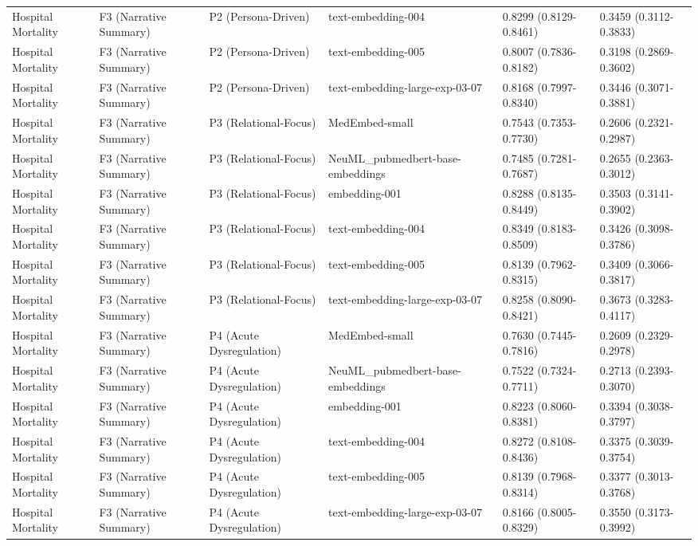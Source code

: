 \documentclass[border=0pt]{standalone}
\begin{document}
\begin{adjustbox}{width=\textwidth}
\begin{tabular}{llllll}
Hospital Mortality & F3 (Narrative Summary) & P2 (Persona-Driven) & text-embedding-004 & 0.8299 (0.8129-0.8461) & 0.3459 (0.3112-0.3833) \\
Hospital Mortality & F3 (Narrative Summary) & P2 (Persona-Driven) & text-embedding-005 & 0.8007 (0.7836-0.8182) & 0.3198 (0.2869-0.3602) \\
Hospital Mortality & F3 (Narrative Summary) & P2 (Persona-Driven) & text-embedding-large-exp-03-07 & 0.8168 (0.7997-0.8340) & 0.3446 (0.3071-0.3881) \\
Hospital Mortality & F3 (Narrative Summary) & P3 (Relational-Focus) & MedEmbed-small & 0.7543 (0.7353-0.7730) & 0.2606 (0.2321-0.2987) \\
Hospital Mortality & F3 (Narrative Summary) & P3 (Relational-Focus) & NeuML\_pubmedbert-base-embeddings & 0.7485 (0.7281-0.7687) & 0.2655 (0.2363-0.3012) \\
Hospital Mortality & F3 (Narrative Summary) & P3 (Relational-Focus) & embedding-001 & 0.8288 (0.8135-0.8449) & 0.3503 (0.3141-0.3902) \\
Hospital Mortality & F3 (Narrative Summary) & P3 (Relational-Focus) & text-embedding-004 & 0.8349 (0.8183-0.8509) & 0.3426 (0.3098-0.3786) \\
Hospital Mortality & F3 (Narrative Summary) & P3 (Relational-Focus) & text-embedding-005 & 0.8139 (0.7962-0.8315) & 0.3409 (0.3066-0.3817) \\
Hospital Mortality & F3 (Narrative Summary) & P3 (Relational-Focus) & text-embedding-large-exp-03-07 & 0.8258 (0.8090-0.8421) & 0.3673 (0.3283-0.4117) \\
Hospital Mortality & F3 (Narrative Summary) & P4 (Acute Dysregulation) & MedEmbed-small & 0.7630 (0.7445-0.7816) & 0.2609 (0.2329-0.2978) \\
Hospital Mortality & F3 (Narrative Summary) & P4 (Acute Dysregulation) & NeuML\_pubmedbert-base-embeddings & 0.7522 (0.7324-0.7711) & 0.2713 (0.2393-0.3070) \\
Hospital Mortality & F3 (Narrative Summary) & P4 (Acute Dysregulation) & embedding-001 & 0.8223 (0.8060-0.8381) & 0.3394 (0.3038-0.3797) \\
Hospital Mortality & F3 (Narrative Summary) & P4 (Acute Dysregulation) & text-embedding-004 & 0.8272 (0.8108-0.8436) & 0.3375 (0.3039-0.3754) \\
Hospital Mortality & F3 (Narrative Summary) & P4 (Acute Dysregulation) & text-embedding-005 & 0.8139 (0.7968-0.8314) & 0.3377 (0.3013-0.3768) \\
Hospital Mortality & F3 (Narrative Summary) & P4 (Acute Dysregulation) & text-embedding-large-exp-03-07 & 0.8166 (0.8005-0.8329) & 0.3550 (0.3173-0.3992) \\

\end{tabular}
\end{adjustbox}
\end{document}
